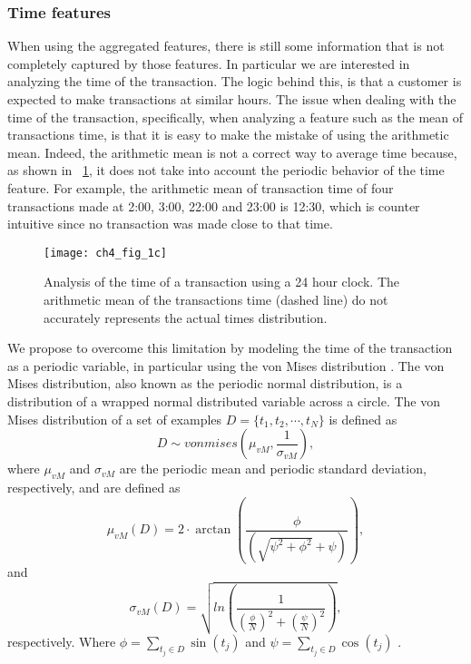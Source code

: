 	\subsubsection{Time features}
	\label{sec:4:frad:features_time}
	
  When using the aggregated features, there is still some information that is not completely 
  captured by those features. In particular we are interested in analyzing the time of the 
  transaction. The logic behind this, is that a customer is expected to make transactions at 
  similar hours. The issue when dealing with the time of the transaction, 
  specifically, when analyzing a feature such as the mean of transactions time, is that it is easy 
  to make the mistake of using the arithmetic mean. Indeed, the arithmetic mean is not a correct 
  way to average time because, as shown in \figurename{~\ref{fig:4:von1}}, it does not take into 
  account the periodic behavior of the time feature. For example, the arithmetic mean of 
  transaction time of four transactions made at 2:00, 3:00, 22:00 and 23:00 is 12:30, which is 
  counter intuitive since no transaction was made close to that time.

  \begin{figure}[!t]
  \centering
  \texttt{[image: ch4\_fig\_1c]}
  \caption{Analysis of the time of a transaction using a 24 hour clock. The arithmetic mean of the 
  transactions time (dashed line) do not accurately represents the actual times distribution.}
  \label{fig:4:von1}
  \end{figure} 
  
  We propose to overcome this limitation by modeling the time of the transaction as a periodic 
  variable, in particular using the von Mises distribution \citep{Fisher1996}. The von Mises 
  distribution, also known   as the periodic normal distribution, is a distribution of a wrapped 
  normal distributed  variable across a circle. The von Mises distribution of a set of examples 
  $D=\{t_1,t_2,\cdots,t_N\}$ is defined as
  \begin{equation}
  D \sim vonmises\left( \mu_{vM} , \frac{1}{\sigma_{vM}} \right),
  \end{equation}
  where $\mu_{vM}$ and $\sigma_{vM}$ are the periodic mean and periodic standard deviation, 
  respectively, and are defined as
  \begin{equation}
    \mu_{vM}(D) =  2\cdot \arctan\left(\frac{\phi}{\left(
    \sqrt{\psi^2 + \phi^2} +  \psi \right)} \right),
  \end{equation}
  and
  \begin{equation}
    \sigma_{vM}(D) = \sqrt{ ln\left( \frac{1}{
    \left(\frac{\phi}{N} \right)^2  + \left(\frac{\psi}{N} \right)^2 } \right) },
  \end{equation}
  respectively. Where $\phi=\sum_{t_j \in D} \sin(t_j)$ and $\psi=\sum_{t_j \in D }\cos(t_j)$ 
  \citep{Bishop2006}. 
  
